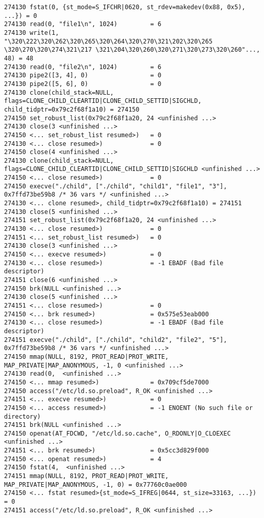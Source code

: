 \begin{verbatim}
274130 fstat(0, {st_mode=S_IFCHR|0620, st_rdev=makedev(0x88, 0x5), ...}) = 0
274130 read(0, "file1\n", 1024)         = 6
274130 write(1, "\320\222\320\262\320\265\320\264\320\270\321\202\320\265 \320\270\320\274\321\217 \321\204\320\260\320\271\320\273\320\260"..., 48) = 48
274130 read(0, "file2\n", 1024)         = 6
274130 pipe2([3, 4], 0)                 = 0
274130 pipe2([5, 6], 0)                 = 0
274130 clone(child_stack=NULL, flags=CLONE_CHILD_CLEARTID|CLONE_CHILD_SETTID|SIGCHLD, child_tidptr=0x79c2f68f1a10) = 274150
274150 set_robust_list(0x79c2f68f1a20, 24 <unfinished ...>
274130 close(3 <unfinished ...>
274150 <... set_robust_list resumed>)   = 0
274130 <... close resumed>)             = 0
274150 close(4 <unfinished ...>
274130 clone(child_stack=NULL, flags=CLONE_CHILD_CLEARTID|CLONE_CHILD_SETTID|SIGCHLD <unfinished ...>
274150 <... close resumed>)             = 0
274150 execve("./child", ["./child", "child1", "file1", "3"], 0x7ffd73be59b8 /* 36 vars */ <unfinished ...>
274130 <... clone resumed>, child_tidptr=0x79c2f68f1a10) = 274151
274130 close(5 <unfinished ...>
274151 set_robust_list(0x79c2f68f1a20, 24 <unfinished ...>
274130 <... close resumed>)             = 0
274151 <... set_robust_list resumed>)   = 0
274130 close(3 <unfinished ...>
274150 <... execve resumed>)            = 0
274130 <... close resumed>)             = -1 EBADF (Bad file descriptor)
274151 close(6 <unfinished ...>
274150 brk(NULL <unfinished ...>
274130 close(5 <unfinished ...>
274151 <... close resumed>)             = 0
274150 <... brk resumed>)               = 0x575e53eab000
274130 <... close resumed>)             = -1 EBADF (Bad file descriptor)
274151 execve("./child", ["./child", "child2", "file2", "5"], 0x7ffd73be59b8 /* 36 vars */ <unfinished ...>
274150 mmap(NULL, 8192, PROT_READ|PROT_WRITE, MAP_PRIVATE|MAP_ANONYMOUS, -1, 0 <unfinished ...>
274130 read(0,  <unfinished ...>
274150 <... mmap resumed>)              = 0x709cf5de7000
274150 access("/etc/ld.so.preload", R_OK <unfinished ...>
274151 <... execve resumed>)            = 0
274150 <... access resumed>)            = -1 ENOENT (No such file or directory)
274151 brk(NULL <unfinished ...>
274150 openat(AT_FDCWD, "/etc/ld.so.cache", O_RDONLY|O_CLOEXEC <unfinished ...>
274151 <... brk resumed>)               = 0x5cc3d829f000
274150 <... openat resumed>)            = 4
274150 fstat(4,  <unfinished ...>
274151 mmap(NULL, 8192, PROT_READ|PROT_WRITE, MAP_PRIVATE|MAP_ANONYMOUS, -1, 0) = 0x77760c0ae000
274150 <... fstat resumed>{st_mode=S_IFREG|0644, st_size=33163, ...}) = 0
274151 access("/etc/ld.so.preload", R_OK <unfinished ...>

\end{verbatim}
